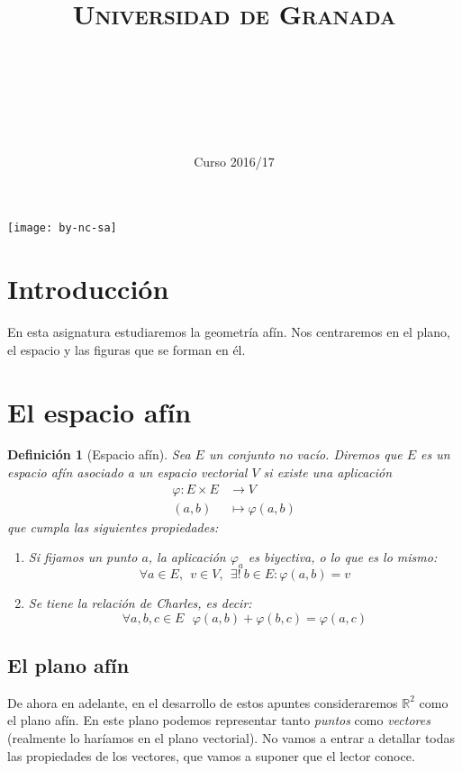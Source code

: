 \documentclass[11pt, a4paper]{article}
\title{
  \normalfont \normalsize
  \textsc{Universidad de Granada} \\ [25pt]    %
  \horrule{0.5pt} \\[0.4cm] %
  \huge \sffamily\subject\\ %
  \horrule{2pt} \\[0.5cm] %
}
\author{\Large\sffamily{\docauthor}}
\date{\vspace{-1.5em} \normalsize \sffamily Curso 2016/17}
\newif\IfInSansMode
\newcommand{\R}{\mathbb{R}}
\theoremstyle{theorem-style}
\theoremstyle{definition-style}
\newtheorem{ndef}{Definición}[section]
\theoremstyle{remark-style}
\theoremstyle{example-style}
\newenvironment{nlist}
{\begin{enumerate}
    \renewcommand\labelenumi{(\emph{\roman{enumi})}}}
  {\end{enumerate}}
\begin{document}
\maketitle  %
\newpage
\tableofcontents    %
\vfill
\begin{center}
  \texttt{[image: by-nc-sa]}  %
\end{center}
\newpage


\section*{Introducción}
En esta asignatura estudiaremos la geometría afín. Nos centraremos en el plano, el espacio y las figuras que se forman en él.
\newpage

\section{El espacio afín}
\begin{ndef}[Espacio afín]
  Sea $E$ un conjunto no vacío. Diremos que $E$ es un \textit{espacio afín} asociado a un espacio vectorial $V$ si existe una aplicación
  \begin{align*}
    \varphi: E \times E & \rightarrow V \\
    (a,b) & \mapsto \varphi(a,b)
  \end{align*}
  que cumpla las siguientes propiedades:
  \begin{nlist}
  \item Si fijamos un punto $a$, la aplicación $\varphi_a$ es biyectiva, o lo que es lo mismo:
    $$\forall a \in E, \ \ v \in V, \ \ \exists! \ b \in E:\varphi(a,b)=v$$
  \item Se tiene la relación de Charles, es decir:
    $$\forall a, b, c \in E \ \ \  \varphi(a,b) + \varphi(b,c) = \varphi(a,c)$$
  \end{nlist}
\end{ndef}
\subsection{El plano afín}

De ahora en adelante, en el desarrollo de estos apuntes consideraremos $\R^2$ como el plano afín. En este plano podemos representar tanto \textit{puntos} como \textit{vectores} (realmente lo haríamos en el plano vectorial). No vamos a entrar a detallar todas las propiedades de los vectores, que vamos a suponer que el lector conoce. \\
\end{document}
